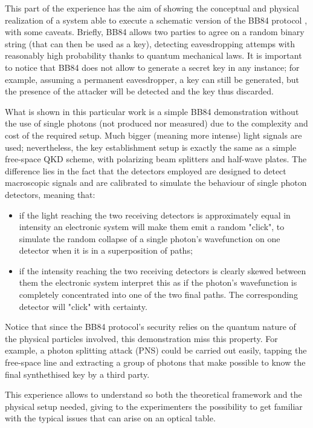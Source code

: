 
This part of the experience has the aim of showing the conceptual and
physical realization
of a system able to execute a schematic version of the BB84 protocol
\cite{Bennett_2014},
with some caveats.
Briefly, BB84 allows two parties to agree on a random binary string
(that can then be used as a key), detecting eavesdropping attemps
with reasonably high probability thanks to quantum mechanical laws.
It is important to notice that BB84 does not allow to generate a
secret key in any instance; for example, assuming a permanent
eavesdropper, a key can still be generated, but the presence of the
attacker will be detected and the key thus discarded.

What is shown in this particular work
is a simple BB84 demonstration without the use of single photons (not
  produced nor
measured) due to the complexity and cost of the
required setup.
Much bigger (meaning more intense) light signals are used; nevertheless, the key
establishment setup is exactly the same as a simple free-space QKD
scheme, with polarizing beam splitters and half-wave plates. The
difference  lies in the fact that the detectors employed are designed
to detect macroscopic signals
and are calibrated to simulate the behaviour of single photon
detectors, meaning that:
\begin{itemize}
  \item if the light reaching the two receiving detectors is
    approximately equal in intensity an electronic system will make them
    emit a random "click", to simulate the random collapse of a
    single photon's wavefunction on one detector when it is in a
    superposition of paths;
  \item if the intensity reaching the two receiving detectors is
    clearly skewed between them the electronic system interpret this
    as if the photon's wavefunction is completely concentrated into
    one of the two final paths. The corresponding detector will
    "click" with certainty.
\end{itemize}
Notice that since the BB84 protocol's security relies on the quantum
nature of the physical particles involved, this demonstration miss
this property. For example, a photon splitting attack (PNS) \cite{PNS_2023}
could be carried out easily, tapping the free-space line
and extracting a group of photons that make possible to know the
final synthethised key by a third party.

This experience allows to understand so both the theoretical
framework and the physical setup needed, giving to the experimenters
the possibility to get familiar with the typical issues that can
arise on an optical table.

